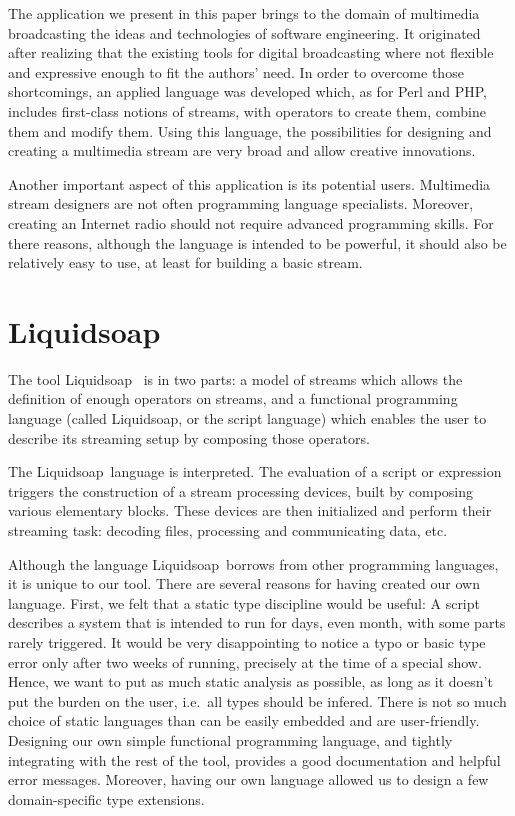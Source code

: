 \documentclass{llncs}
\newcommand{\liquidsoap}{Liquidsoap}
\newcommand{\ie}{{i.e.}}
\begin{document}
The application we present in this paper brings to the domain of multimedia
broadcasting the ideas and technologies of software engineering. It originated 
after realizing that the existing tools for digital broadcasting where not flexible
and expressive enough to fit the authors' need. In order to overcome those shortcomings,
an applied language was developed which, as for Perl and PHP, includes first-class
notions of streams, with operators to create them, combine them and modify them.
Using this language, the possibilities for designing and creating a multimedia stream
are very broad and allow creative innovations.

Another important aspect of this application is its potential users. Multimedia stream 
designers are not often programming language specialists. Moreover, creating an Internet 
radio should not require advanced programming skills.
For there reasons, although the language is intended to be powerful, it should 
also be relatively easy to use, at least for building a basic stream.

\section{\liquidsoap}

The tool \liquidsoap\ \cite{liquidsoap} is in two parts:
  a model of streams which allows the definition of enough
  operators on streams, and a functional programming language
  (called \liquidsoap, or the script language) which enables
  the user to describe its streaming setup by composing those operators.

The \liquidsoap\ language is interpreted.
The evaluation of a script or expression triggers the construction
of a stream processing devices, built by composing various elementary
blocks.
These devices are then initialized and perform their streaming task:
decoding files, processing and communicating data, etc.


Although the language \liquidsoap\ borrows from other programming
languages, it is unique to our tool.
There are several reasons for having created our own language.
First, we felt that a static type discipline would be useful:
A script describes a system that is intended to run for days,
even month, with some parts rarely triggered.
It would be very disappointing to notice a typo or basic type
error only after two weeks of running, precisely at the time
of a special show.
Hence, we want to put as much static analysis as possible,
as long as it doesn't put the burden on the user,
\ie\ all types should be infered.
There is not so much choice of static languages than can be
easily embedded and are user-friendly.
Designing our own simple functional programming language,
and tightly integrating with the rest of the tool,
provides a good documentation and helpful error messages.
Moreover, having our own language allowed us to design
a few domain-specific type extensions.
\end{document}
